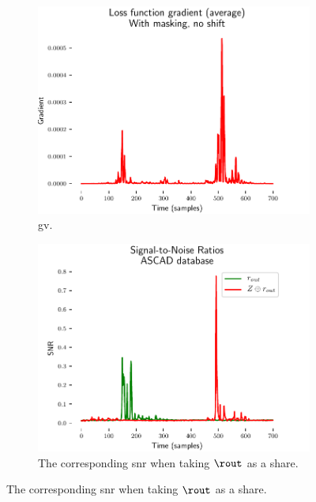 \begin{figure}
    \centering
    \begin{subfigure}{0.49 \textwidth}
        \includegraphics[width=\textwidth]{figures/ASCAD_700/with_mask_no_desynchro/VBP_Node_6191_review}
        \caption{\gls{gv}.}
        \label{fig:vbp_masking_gv}
    \end{subfigure}
    \begin{subfigure}{0.49 \textwidth}
        \includegraphics[width=\textwidth]{figures/ASCAD_700/snr_m_and_zxm}
        \caption{The corresponding \gls{snr} when taking \(\rout\) as a share.}
        \label{fig:vbp_masking_snr}
    \end{subfigure}

\end{figure}
